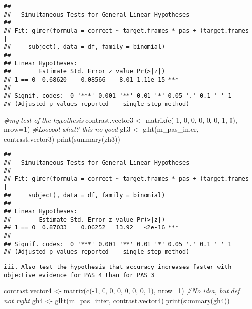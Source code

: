 \documentclass[
]{article}
\newenvironment{Shaded}{\begin{snugshade}}{\end{snugshade}}
\newcommand{\AttributeTok}[1]{\textcolor[rgb]{0.77,0.63,0.00}{#1}}
\newcommand{\CommentTok}[1]{\textcolor[rgb]{0.56,0.35,0.01}{\textit{#1}}}
\newcommand{\DecValTok}[1]{\textcolor[rgb]{0.00,0.00,0.81}{#1}}
\newcommand{\FunctionTok}[1]{\textcolor[rgb]{0.00,0.00,0.00}{#1}}
\newcommand{\NormalTok}[1]{#1}
\newcommand{\OtherTok}[1]{\textcolor[rgb]{0.56,0.35,0.01}{#1}}
\newcommand{\SpecialCharTok}[1]{\textcolor[rgb]{0.00,0.00,0.00}{#1}}
\begin{document}
\begin{verbatim}
## 
##   Simultaneous Tests for General Linear Hypotheses
## 
## Fit: glmer(formula = correct ~ target.frames * pas + (target.frames | 
##     subject), data = df, family = binomial)
## 
## Linear Hypotheses:
##        Estimate Std. Error z value Pr(>|z|)    
## 1 == 0 -0.68620    0.08566   -8.01 1.11e-15 ***
## ---
## Signif. codes:  0 '***' 0.001 '**' 0.01 '*' 0.05 '.' 0.1 ' ' 1
## (Adjusted p values reported -- single-step method)
\end{verbatim}

\begin{Shaded}
\begin{Highlighting}[]
\CommentTok{\#my test of the hypothesis }
\NormalTok{contrast.vector3 }\OtherTok{\textless{}{-}} \FunctionTok{matrix}\NormalTok{(}\FunctionTok{c}\NormalTok{(}\SpecialCharTok{{-}}\DecValTok{1}\NormalTok{, }\DecValTok{0}\NormalTok{, }\DecValTok{0}\NormalTok{, }\DecValTok{0}\NormalTok{, }\DecValTok{0}\NormalTok{, }\DecValTok{0}\NormalTok{, }\DecValTok{1}\NormalTok{, }\DecValTok{0}\NormalTok{), }\AttributeTok{nrow=}\DecValTok{1}\NormalTok{) }\CommentTok{\#Loooool what? this no good}
\NormalTok{gh3 }\OtherTok{\textless{}{-}} \FunctionTok{glht}\NormalTok{(m\_pas\_inter, contrast.vector3)}
\FunctionTok{print}\NormalTok{(}\FunctionTok{summary}\NormalTok{(gh3)) }
\end{Highlighting}
\end{Shaded}

\begin{verbatim}
## 
##   Simultaneous Tests for General Linear Hypotheses
## 
## Fit: glmer(formula = correct ~ target.frames * pas + (target.frames | 
##     subject), data = df, family = binomial)
## 
## Linear Hypotheses:
##        Estimate Std. Error z value Pr(>|z|)    
## 1 == 0  0.87033    0.06252   13.92   <2e-16 ***
## ---
## Signif. codes:  0 '***' 0.001 '**' 0.01 '*' 0.05 '.' 0.1 ' ' 1
## (Adjusted p values reported -- single-step method)
\end{verbatim}

\begin{verbatim}
iii. Also test the hypothesis that accuracy increases faster with objective evidence for PAS 4 than for PAS 3
\end{verbatim}

\begin{Shaded}
\begin{Highlighting}[]
\NormalTok{contrast.vector4 }\OtherTok{\textless{}{-}} \FunctionTok{matrix}\NormalTok{(}\FunctionTok{c}\NormalTok{(}\SpecialCharTok{{-}}\DecValTok{1}\NormalTok{, }\DecValTok{0}\NormalTok{, }\DecValTok{0}\NormalTok{, }\DecValTok{0}\NormalTok{, }\DecValTok{0}\NormalTok{, }\DecValTok{0}\NormalTok{, }\DecValTok{0}\NormalTok{, }\DecValTok{1}\NormalTok{), }\AttributeTok{nrow=}\DecValTok{1}\NormalTok{) }\CommentTok{\#No idea, but def not right}
\NormalTok{gh4 }\OtherTok{\textless{}{-}} \FunctionTok{glht}\NormalTok{(m\_pas\_inter, contrast.vector4)}
\FunctionTok{print}\NormalTok{(}\FunctionTok{summary}\NormalTok{(gh4))}
\end{Highlighting}
\end{Shaded}
\end{document}
